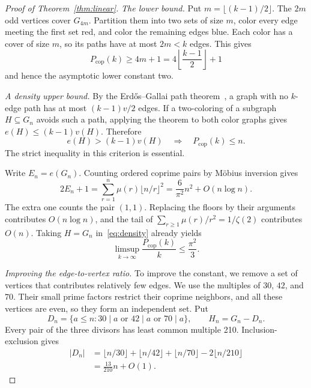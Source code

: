\documentclass[12pt]{article}
\newcommand{\Pcop}{P_{\mathrm{cop}}}
\begin{document}
\begin{proof}[Proof of Theorem~\ref{thm:linear}]
\emph{The lower bound.}
Put $m=\lfloor(k-1)/2\rfloor$. The $2m$ odd vertices cover
$G_{4m}$. Partition them into two sets of size $m$, color
every edge meeting the first set red, and color the remaining
edges blue. Each color has a cover of size $m$, so its paths
have at most $2m<k$ edges. This gives
\[
 \Pcop(k)\geq4m+1
 =4\left\lfloor\frac{k-1}{2}\right\rfloor+1
\]
and hence the asymptotic lower constant two.

\medskip
\noindent\emph{A density upper bound.}
By the Erd\H{o}s--Gallai path theorem~\cite{eg}, a graph
with no $k$-edge path has at most $(k-1)v/2$ edges.
If a two-coloring of a subgraph $H\subseteq G_n$ avoids
such a path, applying the theorem to both color graphs gives
$e(H)\leq(k-1)v(H)$. Therefore
\begin{equation}\label{eq:density}
 e(H)>(k-1)v(H)\quad\Longrightarrow\quad\Pcop(k)\leq n.
\end{equation}
The strict inequality in this criterion is essential.

Write $E_n=e(G_n)$. Counting ordered coprime pairs by
M\"obius inversion gives
\[
 2E_n+1=\sum_{r=1}^n\mu(r)\lfloor n/r\rfloor^2
       =\frac6{\pi^2}n^2+O(n\log n).
\]
The extra one counts the pair $(1,1)$.
Replacing the floors by their arguments contributes
$O(n\log n)$, and the tail of
$\sum_{r\geq1}\mu(r)/r^2=1/\zeta(2)$ contributes $O(n)$.
Taking $H=G_n$ in~\eqref{eq:density} already yields
\[
 \limsup_{k\to\infty}\frac{\Pcop(k)}k\leq\frac{\pi^2}{3}.
\]

\medskip
\noindent\emph{Improving the edge-to-vertex ratio.}
To improve the constant, we remove a set of vertices that
contributes relatively few edges. We use the multiples of
$30$, $42$, and $70$. Their small prime factors restrict
their coprime neighbors, and all these vertices are even,
so they form an independent set. Put
\[
 D_n=\{a\leq n:30\mid a\text{ or }42\mid a\text{ or }70\mid a\},
 \qquad H_n=G_n-D_n.
\]
Every pair of the three divisors has least common multiple
210. Inclusion-exclusion gives
\[
 \begin{split}
 |D_n|
 &=\lfloor n/30\rfloor+\lfloor n/42\rfloor
   +\lfloor n/70\rfloor-2\lfloor n/210\rfloor\\
 &=\frac{13}{210}n+O(1).
 \end{split}
\]


\end{proof}
\end{document}
